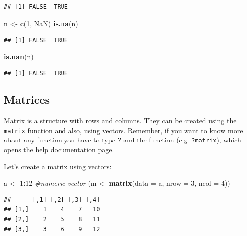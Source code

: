 \documentclass[12pt,graybox,envcountchap,sectrefs]{krantz}
\makeatletter
\newenvironment{Shaded}{\begin{snugshade}}{\end{snugshade}}
\newcommand{\KeywordTok}[1]{\textcolor[rgb]{0.13,0.29,0.53}{\textbf{#1}}}
\newcommand{\DataTypeTok}[1]{\textcolor[rgb]{0.13,0.29,0.53}{#1}}
\newcommand{\DecValTok}[1]{\textcolor[rgb]{0.00,0.00,0.81}{#1}}
\newcommand{\StringTok}[1]{\textcolor[rgb]{0.31,0.60,0.02}{#1}}
\newcommand{\CommentTok}[1]{\textcolor[rgb]{0.56,0.35,0.01}{\textit{#1}}}
\newcommand{\OtherTok}[1]{\textcolor[rgb]{0.56,0.35,0.01}{#1}}
\newcommand{\OperatorTok}[1]{\textcolor[rgb]{0.81,0.36,0.00}{\textbf{#1}}}
\newcommand{\NormalTok}[1]{#1}
\newenvironment{kframe}{%
\medskip{}
\setlength{\fboxsep}{.8em}
 \def\at@end@of@kframe{}%
 \ifinner\ifhmode%
  \def\at@end@of@kframe{\end{minipage}}%
  \begin{minipage}{\columnwidth}%
 \fi\fi%
 \def\FrameCommand##1{\hskip\@totalleftmargin \hskip-\fboxsep
 \colorbox{shadecolor}{##1}\hskip-\fboxsep
     \hskip-\linewidth \hskip-\@totalleftmargin \hskip\columnwidth}%
 \MakeFramed {\advance\hsize-\width
   \@totalleftmargin\z@ \linewidth\hsize
   \@setminipage}}%
 {\par\unskip\endMakeFramed%
 \at@end@of@kframe}
\renewenvironment{Shaded}{\begin{kframe}}{\end{kframe}}
\theoremstyle{definition}
\theoremstyle{definition}
\theoremstyle{definition}
\theoremstyle{remark}
\makeatother
\begin{document}
\begin{verbatim}
## [1] FALSE  TRUE
\end{verbatim}

\begin{Shaded}
\begin{Highlighting}[]
\NormalTok{n <-}\StringTok{ }\KeywordTok{c}\NormalTok{(}\DecValTok{1}\NormalTok{, }\OtherTok{NaN}\NormalTok{)}
\KeywordTok{is.na}\NormalTok{(n)}
\end{Highlighting}
\end{Shaded}

\begin{verbatim}
## [1] FALSE  TRUE
\end{verbatim}

\begin{Shaded}
\begin{Highlighting}[]
\KeywordTok{is.nan}\NormalTok{(n)}
\end{Highlighting}
\end{Shaded}

\begin{verbatim}
## [1] FALSE  TRUE
\end{verbatim}

\subsection{Matrices}\label{matrices}

Matrix is a structure with rows and columns. They can be created using
the \texttt{matrix} function and also, using vectors. Remember, if you
want to know more about any function you have to type \textbf{?} and the
function (e.g. \texttt{?matrix}), which opens the help documentation
page.

Let's create a matrix using vectors:

\begin{Shaded}
\begin{Highlighting}[]
\NormalTok{a <-}\StringTok{ }\DecValTok{1}\OperatorTok{:}\DecValTok{12}  \CommentTok{#numeric vector}
\NormalTok{(m <-}\StringTok{ }\KeywordTok{matrix}\NormalTok{(}\DataTypeTok{data =}\NormalTok{ a, }\DataTypeTok{nrow =} \DecValTok{3}\NormalTok{, }\DataTypeTok{ncol =} \DecValTok{4}\NormalTok{))}
\end{Highlighting}
\end{Shaded}

\begin{verbatim}
##      [,1] [,2] [,3] [,4]
## [1,]    1    4    7   10
## [2,]    2    5    8   11
## [3,]    3    6    9   12
\end{verbatim}
\end{document}
